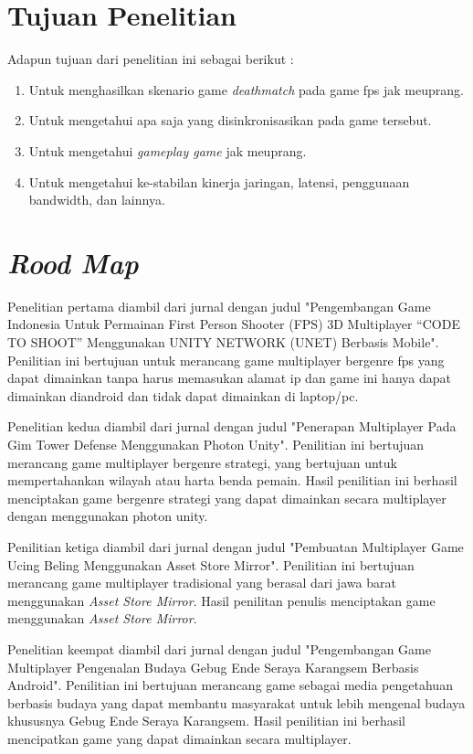 \section{Tujuan Penelitian}
\noindent

Adapun tujuan dari penelitian ini sebagai berikut :
\begin{enumerate}
	\item Untuk menghasilkan skenario game \textit{deathmatch} pada game fps jak meuprang.
	\item Untuk mengetahui apa saja yang disinkronisasikan pada game tersebut.
	\item Untuk mengetahui \textit{gameplay game} jak meuprang.
	\item Untuk mengetahui ke-stabilan kinerja jaringan, latensi, penggunaan bandwidth, dan lainnya. 
\end{enumerate}

\section{\textit{Rood Map}}
\noindent

Penelitian pertama diambil dari jurnal dengan judul "Pengembangan Game Indonesia Untuk Permainan First Person Shooter (FPS) 3D Multiplayer “CODE TO SHOOT” Menggunakan UNITY NETWORK (UNET) Berbasis Mobile".
Penilitian ini bertujuan untuk merancang game multiplayer bergenre fps yang dapat dimainkan tanpa harus memasukan alamat ip dan game ini hanya dapat dimainkan diandroid dan tidak dapat dimainkan di laptop/pc\cite{fps}.

Penelitian kedua diambil dari jurnal dengan judul "Penerapan Multiplayer Pada Gim Tower Defense Menggunakan Photon Unity". Penilitian ini bertujuan merancang game multiplayer bergenre strategi, yang bertujuan untuk mempertahankan wilayah atau harta benda pemain. Hasil penilitian ini berhasil menciptakan game bergenre strategi yang dapat dimainkan secara multiplayer dengan menggunakan photon unity\cite{Sarwodi}.

Penilitian ketiga diambil dari jurnal dengan judul "Pembuatan Multiplayer Game Ucing Beling Menggunakan Asset 
Store Mirror". Penilitian ini bertujuan merancang game multiplayer tradisional yang berasal dari jawa barat menggunakan \textit{Asset Store Mirror}. Hasil penilitan penulis menciptakan game menggunakan \textit{Asset Store Mirror}\cite{Ansori}.

Penelitian keempat diambil dari jurnal dengan judul "Pengembangan Game Multiplayer Pengenalan 
Budaya Gebug Ende Seraya Karangsem Berbasis 
Android". Penilitian ini bertujuan merancang game sebagai media pengetahuan berbasis budaya yang dapat membantu masyarakat untuk lebih mengenal budaya khususnya Gebug Ende Seraya Karangsem. Hasil penilitian ini berhasil mencipatkan game yang dapat dimainkan secara multiplayer\cite{Gebug}.

